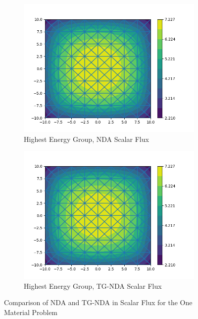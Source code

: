 \DIFdelend %
\begin{figure}[H]
\centering
\begin{subfigure}{.5\textwidth}
  \centering
  \includegraphics[width=\linewidth]{fig/nda_c5g7mod_scalar_flux_group0.png}
  \caption{Highest Energy Group, NDA Scalar Flux}
  \label{fig:NDA-Mod}
\end{subfigure}%
\begin{subfigure}{.5\textwidth}
  \centering
  \includegraphics[width=\linewidth]{fig/tgnda_c5g7mod_scalar_flux_group0.png}
  \caption{Highest Energy Group, TG-NDA Scalar Flux}
  \label{fig:TG-NDA-Mod}
\end{subfigure}
\caption{Comparison of NDA and TG-NDA in Scalar Flux for the One Material Problem}
\label{fig:Moderator}
\end{figure}

